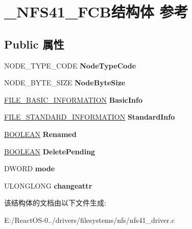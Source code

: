 \hypertarget{struct___n_f_s41___f_c_b}{}\section{\+\_\+\+N\+F\+S41\+\_\+\+F\+C\+B结构体 参考}
\label{struct___n_f_s41___f_c_b}
\subsection*{Public 属性}
\begin{DoxyCompactItemize}
\item 
\mbox{\label{struct___n_f_s41___f_c_b_a66f1f4063575663c7e25cdfde45e6e8e}} 
N\+O\+D\+E\+\_\+\+T\+Y\+P\+E\+\_\+\+C\+O\+DE {\bfseries Node\+Type\+Code}
\item 
\mbox{\label{struct___n_f_s41___f_c_b_a15ec7147821f4db92cef433feaf2ccdf}} 
N\+O\+D\+E\+\_\+\+B\+Y\+T\+E\+\_\+\+S\+I\+ZE {\bfseries Node\+Byte\+Size}
\item 
\mbox{\label{struct___n_f_s41___f_c_b_aafea06db1beb98638f08ec5e276582a7}} 
\hyperlink{struct___f_i_l_e___b_a_s_i_c___i_n_f_o_r_m_a_t_i_o_n}{F\+I\+L\+E\+\_\+\+B\+A\+S\+I\+C\+\_\+\+I\+N\+F\+O\+R\+M\+A\+T\+I\+ON} {\bfseries Basic\+Info}
\item 
\mbox{\label{struct___n_f_s41___f_c_b_adbc1a859d3d69524616c3e2bf00215ad}} 
\hyperlink{struct___f_i_l_e___s_t_a_n_d_a_r_d___i_n_f_o_r_m_a_t_i_o_n}{F\+I\+L\+E\+\_\+\+S\+T\+A\+N\+D\+A\+R\+D\+\_\+\+I\+N\+F\+O\+R\+M\+A\+T\+I\+ON} {\bfseries Standard\+Info}
\item 
\mbox{\label{struct___n_f_s41___f_c_b_a52941f1ee658a652a9992ce6b81847a4}} 
\hyperlink{_processor_bind_8h_a112e3146cb38b6ee95e64d85842e380a}{B\+O\+O\+L\+E\+AN} {\bfseries Renamed}
\item 
\mbox{\label{struct___n_f_s41___f_c_b_ad86579901f663817fedfc8dad377b7b1}} 
\hyperlink{_processor_bind_8h_a112e3146cb38b6ee95e64d85842e380a}{B\+O\+O\+L\+E\+AN} {\bfseries Delete\+Pending}
\item 
\mbox{\label{struct___n_f_s41___f_c_b_aaaa387b33e2eacd90d7f6ae3f84be806}} 
D\+W\+O\+RD {\bfseries mode}
\item 
\mbox{\label{struct___n_f_s41___f_c_b_afcad888921b72e949eb82598c3a62ae4}} 
U\+L\+O\+N\+G\+L\+O\+NG {\bfseries changeattr}
\end{DoxyCompactItemize}


该结构体的文档由以下文件生成\+:\begin{DoxyCompactItemize}
\item 
E\+:/\+React\+O\+S-\/0../drivers/filesystems/nfs/nfs41\+\_\+driver.\+c\end{DoxyCompactItemize}
